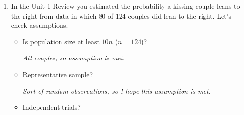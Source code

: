 \begin{enumerate}
\begin{enumerate}
\begin{key}
  {\it  One spin should be like another, so I don't question this  assumption.}
\end{key}
        \item Independent trials?   
\begin{students}
        \vspace{.7cm}        
\end{students}

\begin{key}
  {\it  If there is no cheating, this assumption is met.}
\end{key}
        \item At least 10 successes? at least 10 failures?   
\begin{students}
        \vspace{.7cm}        
\end{students}

\begin{key}
  {\it  Not met. 27 ``Failures'' and only 3 ``Successes''.}
\end{key}
     \end{enumerate}


    \item In the Unit 1 Review you estimated the probability
      a kissing couple leans to the right from data in which 80 of 124
      couples did lean to the right. Let's check assumptions. 
  
     \begin{itemize}
        \item Is population size at least $10n$ ($n = 124$)? 
\begin{students}
        \vspace{.7cm}        
\end{students}

\begin{key}
  {\it  All couples, so assumption is met.}
\end{key}
        \item Representative sample?   
\begin{students}
        \vspace{1cm}        
\end{students}

\begin{key}
  {\it  Sort of random observations, so I hope this   assumption is met.}
\end{key}
        \item Independent trials?   
\begin{students}
        \vspace{1cm}        
\end{students}


\end{itemize}
\end{enumerate}
